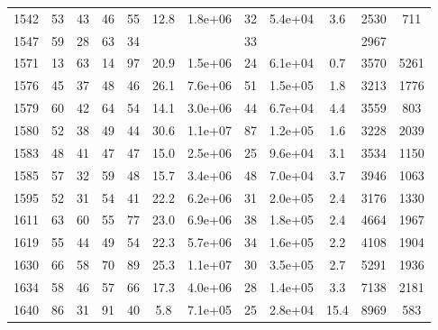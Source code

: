 \begin{table}
\begin{tabular}{cccccccccccc}
1542 & 53 & 43 & 46 & 55 & 12.8 & 1.8e+06 & 32 & 5.4e+04 & 3.6 & 2530 & 711 \\
1547 & 59 & 28 & 63 & 34 &  &  & 33 &  &  & 2967 &  \\
1571 & 13 & 63 & 14 & 97 & 20.9 & 1.5e+06 & 24 & 6.1e+04 & 0.7 & 3570 & 5261 \\
1576 & 45 & 37 & 48 & 46 & 26.1 & 7.6e+06 & 51 & 1.5e+05 & 1.8 & 3213 & 1776 \\
1579 & 60 & 42 & 64 & 54 & 14.1 & 3.0e+06 & 44 & 6.7e+04 & 4.4 & 3559 & 803 \\
1580 & 52 & 38 & 49 & 44 & 30.6 & 1.1e+07 & 87 & 1.2e+05 & 1.6 & 3228 & 2039 \\
1583 & 48 & 41 & 47 & 47 & 15.0 & 2.5e+06 & 25 & 9.6e+04 & 3.1 & 3534 & 1150 \\
1585 & 57 & 32 & 59 & 48 & 15.7 & 3.4e+06 & 48 & 7.0e+04 & 3.7 & 3946 & 1063 \\
1595 & 52 & 31 & 54 & 41 & 22.2 & 6.2e+06 & 31 & 2.0e+05 & 2.4 & 3176 & 1330 \\
1611 & 63 & 60 & 55 & 77 & 23.0 & 6.9e+06 & 38 & 1.8e+05 & 2.4 & 4664 & 1967 \\
1619 & 55 & 44 & 49 & 54 & 22.3 & 5.7e+06 & 34 & 1.6e+05 & 2.2 & 4108 & 1904 \\
1630 & 66 & 58 & 70 & 89 & 25.3 & 1.1e+07 & 30 & 3.5e+05 & 2.7 & 5291 & 1936 \\
1634 & 58 & 46 & 57 & 66 & 17.3 & 4.0e+06 & 28 & 1.4e+05 & 3.3 & 7138 & 2181 \\
1640 & 86 & 31 & 91 & 40 & 5.8 & 7.1e+05 & 25 & 2.8e+04 & 15.4 & 8969 & 583 \\
\end{tabular}
\end{table}
